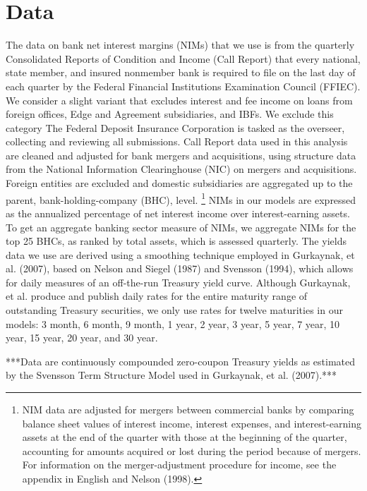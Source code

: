 \documentclass[12pt]{article}
\begin{document}
\section{Data}
The data on bank net interest margins (NIMs) that we use is from the quarterly Consolidated Reports of Condition and Income (Call Report) that every national, state member, and insured nonmember bank is required to file on the last day of each quarter by the Federal Financial Institutions Examination Council (FFIEC). We consider a slight variant that excludes interest and fee income on loans from foreign offices, Edge and Agreement subsidiaries, and IBFs. We exclude this category The Federal Deposit Insurance Corporation is tasked as the overseer, collecting and reviewing all submissions. Call Report data used in this analysis are cleaned and adjusted for bank mergers and acquisitions, using structure data from the National Information Clearinghouse (NIC) on mergers and acquisitions. Foreign entities are excluded and domestic subsidiaries are aggregated up to the parent, bank-holding-company (BHC), level. \footnote{NIM data are adjusted for mergers between commercial banks by comparing balance sheet values of interest income, interest expenses, and interest-earning assets at the end of the quarter with those at the beginning of the quarter, accounting for amounts acquired or lost during the period because of mergers. For information on the merger-adjustment procedure for income, see the appendix in English and Nelson (1998).} \newline \newline
NIMs in our models are expressed as the annualized percentage of net interest income over interest-earning assets. To get an aggregate banking sector measure of NIMs, we aggregate NIMs for the top 25 BHCs, as ranked by total assets, which is assessed quarterly. \newline \newline
The yields data we use are derived using a smoothing technique employed in Gurkaynak, et al. (2007), based on Nelson and Siegel (1987) and Svensson (1994), which allows for daily measures of an off-the-run Treasury yield curve. Although Gurkaynak, et al. produce and publish daily rates for the entire maturity range of outstanding Treasury securities, we only use rates for twelve maturities in our models: 3 month, 6 month, 9 month, 1 year, 2 year, 3 year, 5 year, 7 year, 10 year, 15 year, 20 year, and 30 year.

***Data are continuously compounded zero-coupon Treasury yields as estimated by the Svensson Term Structure Model used in Gurkaynak, et al. (2007).***
\end{document}
